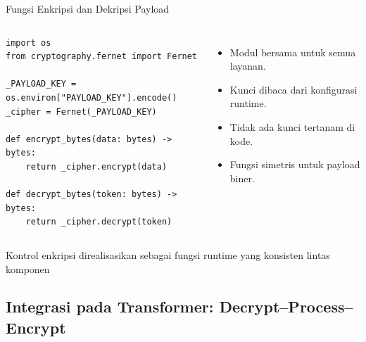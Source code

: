 \documentclass[aspectratio=169, table]{beamer}
\begin{document}
\begin{frame}[fragile]{Fungsi Enkripsi dan Dekripsi Payload}
	\vspace{6pt}
	\begin{columns}[t]
		\begin{lstlisting}[style=PythonStyle, caption={Shared crypto helpers using PAYLOAD\_KEY }]
import os
from cryptography.fernet import Fernet

_PAYLOAD_KEY = os.environ["PAYLOAD_KEY"].encode()
_cipher = Fernet(_PAYLOAD_KEY)

def encrypt_bytes(data: bytes) -> bytes:
    return _cipher.encrypt(data)

def decrypt_bytes(token: bytes) -> bytes:
    return _cipher.decrypt(token)
\end{lstlisting}
		
		\begin{itemize}
			\item Modul bersama untuk semua layanan.
			\item Kunci dibaca dari konfigurasi runtime.
			\item Tidak ada kunci tertanam di kode.
			\item Fungsi simetris untuk payload biner.
		\end{itemize}
	\end{columns}
	
	\vspace{4pt}
	{\footnotesize Kontrol enkripsi direalisasikan sebagai fungsi runtime yang konsisten lintas komponen}
\end{frame}

\subsection*{Integrasi pada Transformer: Decrypt--Process--Encrypt}
\end{document}

